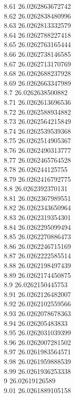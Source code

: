 {8.61	26.0262863672742\\
8.62	26.0262838480996\\
8.63	26.0262813332579\\
8.64	26.0262788227418\\
8.65	26.0262763165444\\
8.66	26.0262738146585\\
8.67	26.0262713170769\\
8.68	26.0262688237928\\
8.69	26.0262663347989\\
8.7	26.0262638500882\\
8.71	26.0262613696536\\
8.72	26.0262588934882\\
8.73	26.0262564215849\\
8.74	26.0262539539368\\
8.75	26.0262514905367\\
8.76	26.0262490313777\\
8.77	26.0262465764528\\
8.78	26.026244125755\\
8.79	26.0262416792775\\
8.8	26.0262392370131\\
8.81	26.0262367989551\\
8.82	26.0262343650964\\
8.83	26.0262319354301\\
8.84	26.0262295099494\\
8.85	26.0262270886473\\
8.86	26.0262246715169\\
8.87	26.0262222585514\\
8.88	26.0262198497439\\
8.89	26.0262174450875\\
8.9	26.0262150445753\\
8.91	26.0262126482007\\
8.92	26.0262102559566\\
8.93	26.0262078678363\\
8.94	26.026205483833\\
8.95	26.0262031039399\\
8.96	26.0262007281502\\
8.97	26.0261983564571\\
8.98	26.0261959888539\\
8.99	26.0261936253338\\
9	26.02619126589\\
9.01	26.0261889105158\\
}
